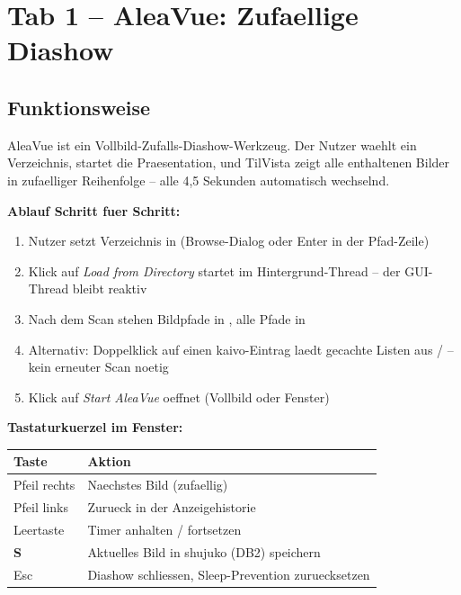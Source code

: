 \chapter{Tab 1 -- AleaVue: Zufaellige Diashow}

\section{Funktionsweise}

AleaVue ist ein Vollbild-Zufalls-Diashow-Werkzeug.
Der Nutzer waehlt ein Verzeichnis, startet die Praesentation,
und TilVista zeigt alle enthaltenen Bilder in zufaelliger
Reihenfolge -- alle 4,5 Sekunden automatisch wechselnd.

\textbf{Ablauf Schritt fuer Schritt:}
\begin{enumerate}
  \item Nutzer setzt Verzeichnis in 
        (Browse-Dialog oder Enter in der Pfad-Zeile)
  \item Klick auf \emph{Load from Directory} startet
         im Hintergrund-Thread --
        der GUI-Thread bleibt reaktiv
  \item Nach dem Scan stehen Bildpfade in
        , alle Pfade in
  \item Alternativ: Doppelklick auf einen kaivo-Eintrag
        laedt gecachte Listen aus /
        -- kein erneuter Scan noetig
  \item Klick auf \emph{Start AleaVue} oeffnet
         (Vollbild oder Fenster)
\end{enumerate}

\textbf{Tastaturkuerzel im Fenster:}
\begin{center}
\small
\begin{tabular}{ll}
\toprule
\textbf{Taste} & \textbf{Aktion} \\
\midrule
Pfeil rechts & Naechstes Bild (zufaellig) \\
Pfeil links  & Zurueck in der Anzeigehistorie \\
Leertaste    & Timer anhalten / fortsetzen \\
\textbf{S}   & Aktuelles Bild in shujuko (DB2) speichern \\
Esc          & Diashow schliessen, Sleep-Prevention zuruecksetzen \\
\bottomrule
\end{tabular}
\end{center}

